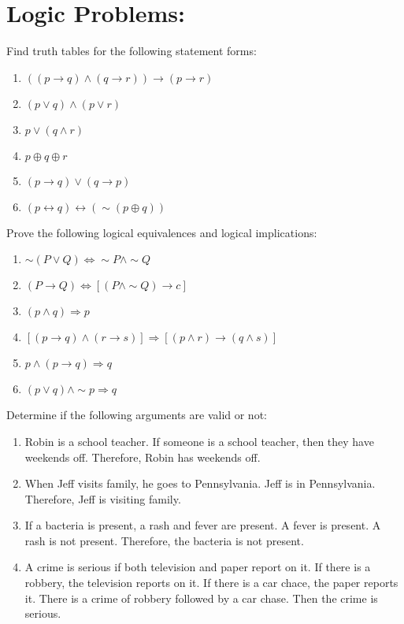 \documentclass[14,fleqn]{article}
\begin{document}
\section{Logic Problems:}

Find truth tables for the following statement forms:
\begin{enumerate}
	\item $((p\to q)\wedge (q\to r))\to (p\to r)$
	\item $(p\vee q)\wedge (p\vee r)$
	\item $p\vee (q\wedge r)$
	\item $p\oplus q \oplus r$
	\item $(p\to q)\vee (q\to p)$
	\item $(p\leftrightarrow q)\leftrightarrow (\sim (p\oplus q))$
\end{enumerate}

Prove the following logical equivalences and logical implications:
\begin{enumerate}
	\item $\sim (P\vee Q)\Leftrightarrow \sim P\wedge \sim Q$
	\item $(P\to Q)\Leftrightarrow [(P\wedge \sim Q)\to c]$
	\item $(p\wedge q)\Rightarrow p$
	\item $[(p\to q)\wedge (r\to s)]\Rightarrow [(p\wedge r)\to (q\wedge s)]$
	\item $p\wedge (p\to q) \Rightarrow q$
	\item $(p\vee q)\wedge \sim p \Rightarrow q$
\end{enumerate}

Determine if the following arguments are valid or not:
\begin{enumerate}
	\item Robin is a school teacher. If someone is a school teacher, then they have weekends off. Therefore, Robin has weekends off.
	\item When Jeff visits family, he goes to Pennsylvania. Jeff is in Pennsylvania. Therefore, Jeff is visiting family.
	\item If a bacteria is present, a rash and fever are present. A fever is present. A rash is not present. Therefore, the bacteria is not present.
	\item A crime is serious if both television and paper report on it. If there is a robbery, the television reports on it. If there is a car chace, the paper reports it. There is a crime of robbery followed by a car chase. Then the crime is serious.

\end{enumerate}
\end{document}
